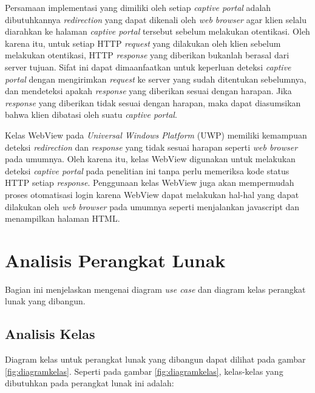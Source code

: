 Persamaan implementasi yang dimiliki oleh setiap \textit{captive portal} adalah dibutuhkannya \textit{redirection} yang dapat dikenali oleh \textit{web browser} agar klien selalu diarahkan ke halaman \textit{captive portal} tersebut sebelum melakukan otentikasi. Oleh karena itu, untuk setiap HTTP \textit{request} yang dilakukan oleh klien sebelum melakukan otentikasi, HTTP \textit{response} yang diberikan bukanlah berasal dari server tujuan. Sifat ini dapat dimaanfaatkan untuk keperluan deteksi \textit{captive portal} dengan mengirimkan \textit{request} ke server yang sudah ditentukan sebelumnya, dan mendeteksi apakah \textit{response} yang diberikan sesuai dengan harapan. Jika \textit{response} yang diberikan tidak sesuai dengan harapan, maka dapat diasumsikan bahwa klien dibatasi oleh suatu \textit{captive portal}.

Kelas WebView pada \textit{Universal Windows Platform} (UWP) memiliki kemampuan deteksi \textit{redirection} dan \textit{response} yang tidak sesuai harapan seperti \textit{web browser} pada umumnya. Oleh karena itu, kelas WebView digunakan untuk melakukan deteksi \textit{captive portal} pada penelitian ini tanpa perlu memeriksa kode status HTTP setiap \textit{response}. Penggunaan kelas WebView juga akan mempermudah proses otomatisasi login karena WebView dapat melakukan hal-hal yang dapat dilakukan oleh \textit{web browser} pada umumnya seperti menjalankan javascript dan menampilkan halaman HTML.



\section{Analisis Perangkat Lunak}
\label{sec:analisis_perangkat_lunak}

Bagian ini menjelaskan mengenai diagram \textit{use case} dan diagram kelas perangkat lunak yang dibangun.

\subsection{Analisis Kelas}
\label{sec:analisis_kelas}

Diagram kelas untuk perangkat lunak yang dibangun dapat dilihat pada gambar \ref{fig:diagramkelas}. Seperti pada gambar \ref{fig:diagramkelas}, kelas-kelas yang dibutuhkan pada perangkat lunak ini adalah:

